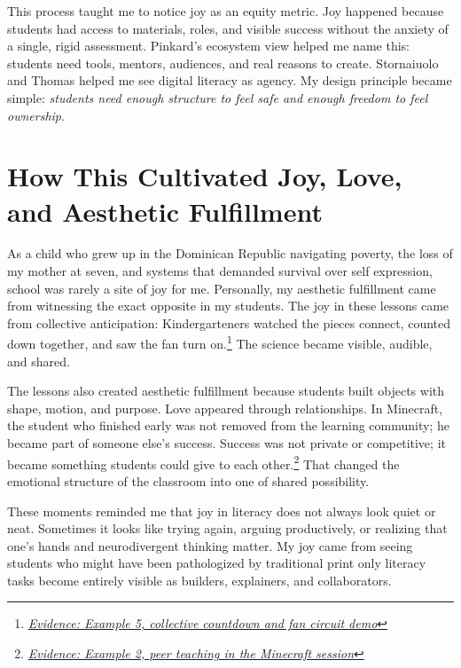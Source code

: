 \documentclass[11pt]{article}
\begin{document}
This process taught me to notice joy as an equity metric. Joy happened because students had access to materials, roles, and visible success without the anxiety of a single, rigid assessment. Pinkard's ecosystem view helped me name this: students need tools, mentors, audiences, and real reasons to create. Stornaiuolo and Thomas helped me see digital literacy as agency. My design principle became simple: \textit{students need enough structure to feel safe and enough freedom to feel ownership}.



\newpage
\section*{How This Cultivated Joy, Love, and Aesthetic Fulfillment}

As a child who grew up in the Dominican Republic navigating poverty, the loss of my mother at seven, and systems that demanded survival over self expression, school was rarely a site of joy for me. Personally, my aesthetic fulfillment came from witnessing the exact opposite in my students. The joy in these lessons came from collective anticipation: Kindergarteners watched the pieces connect, counted down together, and saw the fan turn on.\footnote{\href{https://github.com/pzg8794/EDU498-joy_oriented_literacy_pursuit_journal/blob/main/kindergarten-circuit-demo-airplane-prep-evidence.md}{\textit{Evidence: Example 5, collective countdown and fan circuit demo}}} The science became visible, audible, and shared.

The lessons also created aesthetic fulfillment because students built objects with shape, motion, and purpose. Love appeared through relationships. In Minecraft, the student who finished early was not removed from the learning community; he became part of someone else's success. Success was not private or competitive; it became something students could give to each other.\footnote{\href{https://github.com/pzg8794/EDU498-joy_oriented_literacy_pursuit_journal/blob/main/grade-4-minecraft-agent-challenge-evidence.md}{\textit{Evidence: Example 2, peer teaching in the Minecraft session}}} That changed the emotional structure of the classroom into one of shared possibility.

These moments reminded me that joy in literacy does not always look quiet or neat. Sometimes it looks like trying again, arguing productively, or realizing that one's hands and neurodivergent thinking matter. My joy came from seeing students who might have been pathologized by traditional print only literacy tasks become entirely visible as builders, explainers, and collaborators.
\end{document}
